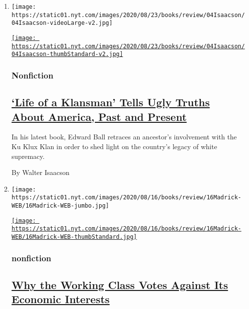 \begin{enumerate}
\def\labelenumi{\arabic{enumi}.}
\item
  \texttt{[image: https://static01.nyt.com/images/2020/08/23/books/review/04Isaacson/04Isaacson-videoLarge-v2.jpg]}

  \href{/2020/08/04/books/review/life-of-a-klansman-edward-ball.html}{\texttt{[image: https://static01.nyt.com/images/2020/08/23/books/review/04Isaacson/04Isaacson-thumbStandard-v2.jpg]}}

  \hypertarget{nonfiction}{%
  \subsubsection{Nonfiction}\label{nonfiction}}

  \hypertarget{life-of-a-klansman-tells-ugly-truths-about-america-past-and-present}{%
  \subsection{\texorpdfstring{\href{/2020/08/04/books/review/life-of-a-klansman-edward-ball.html}{`Life
  of a Klansman' Tells Ugly Truths About America, Past and
  Present}}{`Life of a Klansman' Tells Ugly Truths About America, Past and Present}}\label{life-of-a-klansman-tells-ugly-truths-about-america-past-and-present}}

  In his latest book, Edward Ball retraces an ancestor's involvement
  with the Ku Klux Klan in order to shed light on the country's legacy
  of white supremacy.

  By Walter Isaacson
\item
  \texttt{[image: https://static01.nyt.com/images/2020/08/16/books/review/16Madrick-WEB/16Madrick-WEB-jumbo.jpg]}

  \href{/2020/07/31/books/review/the-system-robert-reich-break-em-up-zephyr-teachout.html}{\texttt{[image: https://static01.nyt.com/images/2020/08/16/books/review/16Madrick-WEB/16Madrick-WEB-thumbStandard.jpg]}}

  \hypertarget{nonfiction-1}{%
  \subsubsection{nonfiction}\label{nonfiction-1}}

  \hypertarget{why-the-working-class-votes-against-its-economic-interests}{%
  \subsection{\texorpdfstring{\href{/2020/07/31/books/review/the-system-robert-reich-break-em-up-zephyr-teachout.html}{Why
  the Working Class Votes Against Its Economic
  Interests}}{Why the Working Class Votes Against Its Economic Interests}}\label{why-the-working-class-votes-against-its-economic-interests}}


\end{enumerate}
